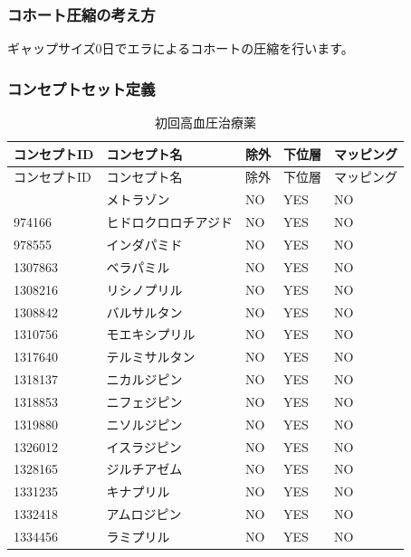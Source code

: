\documentclass[
  11pt]{book}
\theoremstyle{definition}
\theoremstyle{definition}
\theoremstyle{definition}
\theoremstyle{definition}
\theoremstyle{remark}
\begin{document}
\subsubsection*{コホート圧縮の考え方}\label{ux30b3ux30dbux30fcux30c8ux5727ux7e2eux306eux8003ux3048ux65b9-1}

ギャップサイズ0日でエラによるコホートの圧縮を行います。

\subsubsection*{コンセプトセット定義}\label{ux30b3ux30f3ux30bbux30d7ux30c8ux30bbux30c3ux30c8ux5b9aux7fa9-3}

\begin{longtable}[]{@{}lllll@{}}
\caption{\label{tab:HTN1yrFO1stLine} 初回高血圧治療薬}\tabularnewline
\toprule\noalign{}
コンセプトID & コンセプト名 & 除外 & 下位層 & マッピング \\
\midrule\noalign{}
\endfirsthead
\toprule\noalign{}
コンセプトID & コンセプト名 & 除外 & 下位層 & マッピング \\
\midrule\noalign{}
\endhead
\bottomrule\noalign{}
\endlastfoot
907013 & メトラゾン & NO & YES & NO \\
974166 & ヒドロクロロチアジド & NO & YES & NO \\
978555 & インダパミド & NO & YES & NO \\
1307863 & ベラパミル & NO & YES & NO \\
1308216 & リシノプリル & NO & YES & NO \\
1308842 & バルサルタン & NO & YES & NO \\
1310756 & モエキシプリル & NO & YES & NO \\
1317640 & テルミサルタン & NO & YES & NO \\
1318137 & ニカルジピン & NO & YES & NO \\
1318853 & ニフェジピン & NO & YES & NO \\
1319880 & ニソルジピン & NO & YES & NO \\
1326012 & イスラジピン & NO & YES & NO \\
1328165 & ジルチアゼム & NO & YES & NO \\
1331235 & キナプリル & NO & YES & NO \\
1332418 & アムロジピン & NO & YES & NO \\
1334456 & ラミプリル & NO & YES & NO \\

\end{longtable}
\end{document}

